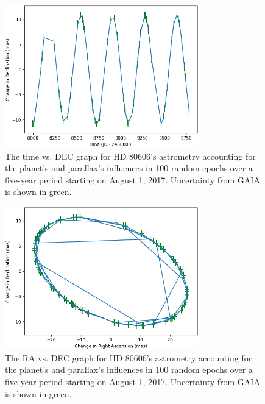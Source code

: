 \documentclass[12pt]{article}
\begin{document}
\begin{figure}[H]
\centering
\includegraphics[width=0.75\textwidth]{parallax_time_dec.png}
\vspace{-1em}
\caption{The time vs. DEC graph for HD 80606's astrometry accounting for the planet's and parallax's influences in 100 random epochs over a five-year period starting on August 1, 2017. Uncertainty from GAIA is shown in green.}
\end{figure}
\vspace{-1em}
\begin{figure}[H]
\centering
\includegraphics[width=0.75\textwidth]{parallax_ra_dec.png}
\vspace{-1em}
\caption{The RA vs. DEC graph for HD 80606's astrometry accounting for the planet's and parallax's influences in 100 random epochs over a five-year period starting on August 1, 2017. Uncertainty from GAIA is shown in green.}
\end{figure}
\vspace{-1em}
\end{document}
